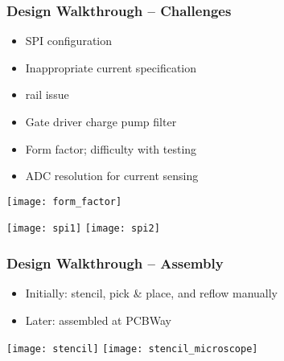 \begin{frame}\frametitle{Design Walkthrough -- Challenges}
	\begin{minipage}{0.6\textwidth}
		\begin{itemize}
			\item SPI configuration
			\item Inappropriate current specification
			\item {} rail issue
			\item Gate driver charge pump filter
			\item Form factor; difficulty with testing
			\item ADC resolution for current sensing
		\end{itemize}
	\end{minipage}%
	\begin{minipage}{0.4\textwidth}
		\texttt{[image: form\_factor]}
	\end{minipage}
	\begin{center}
		\texttt{[image: spi1]}
		\texttt{[image: spi2]}
	\end{center}
\end{frame}
\begin{frame}\frametitle{Design Walkthrough -- Assembly}
	\begin{itemize}
		\item Initially: stencil, pick \& place, and reflow manually
		\item Later: assembled at PCBWay
	\end{itemize}
	\begin{center}
		\texttt{[image: stencil]}
		\texttt{[image: stencil\_microscope]}
	\end{center}
\end{frame}
